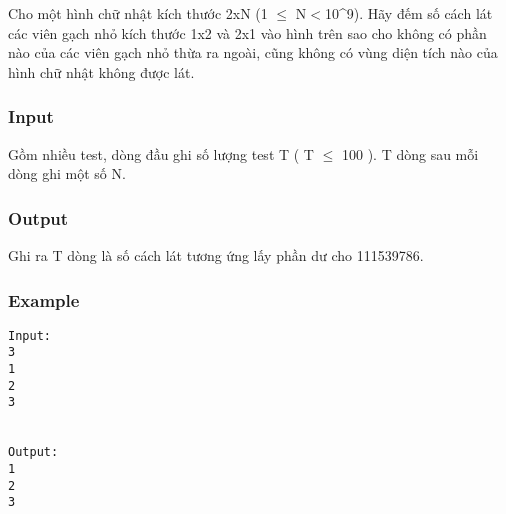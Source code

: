 



   Cho một hình chữ nhật kích thước 2xN (1 $\le$ N$<$10^9). Hãy đếm số cách lát các viên gạch nhỏ kích thước 1x2 và 2x1 vào hình trên sao cho không có phần nào của các viên gạch nhỏ thừa ra ngoài, cũng không có vùng diện tích nào của hình chữ nhật không được lát.  

\subsubsection{   Input  }

   Gồm nhiều test, dòng đầu ghi số lượng test T ( T $\le$ 100 ). T dòng sau mỗi dòng ghi một số N.  

\subsubsection{   Output  }

   Ghi ra T dòng là số cách lát tương ứng lấy phần dư cho 111539786.  

\subsubsection{   Example  }
\begin{verbatim}
Input:
3
1
2
3


Output:
1
2
3

\end{verbatim}
